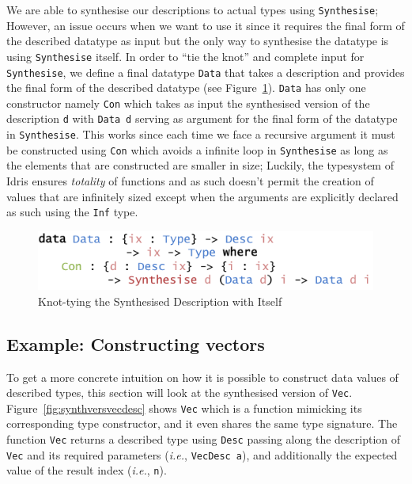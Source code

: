 \documentclass{ituthesis}
\newcommand{\ttconstructor}[1]{\textcolor{constructor-color}{\texttt{#1}}}
\newcommand{\tttype}[1]{\textcolor{type-color}{\texttt{#1}}}
\newcommand{\ttdec}[1]{\textcolor{declared-var-color}{\texttt{#1}}}
\newcommand{\ttvar}[1]{\textcolor{local-var-color}{\texttt{#1}}}
\begin{document}
We are able to synthesise our descriptions to actual types using \ttdec{Synthesise}; However, an issue occurs when we want to use it since it requires the final form of the described datatype as input but the only way to synthesise the datatype is using \ttdec{Synthesise} itself.
In order to ``tie the knot'' and complete input for \ttdec{Synthesise}, we define a final datatype \tttype{Data} that takes a description and provides the final form of the described datatype (see Figure~\ref{fig:datafromdesc}).
\tttype{Data} has only one constructor namely \ttconstructor{Con} which takes as input the synthesised version of the description \ttvar{d} with \tttype{Data}~\ttvar{d} serving as argument for the final form of the datatype in \ttdec{Synthesise}. This works since each time we face a recursive argument it must be constructed using \ttconstructor{Con} which avoids a infinite loop in \ttdec{Synthesise} as long as the elements that are constructed are smaller in size; Luckily, the typesystem of Idris ensures \textit{totality} of functions and as such doesn't permit the creation of values that are infinitely sized except when the arguments are explicitly declared as such using the \tttype{Inf} type.

\begin{figure}[ht]
\begin{center}
    \includegraphics[scale=0.5]{Figures/TyingTheSynthesisKnot.png}
\end{center}
\caption{Knot-tying the Synthesised Description with Itself}
\label{fig:datafromdesc}
\end{figure}

\subsection{Example: Constructing vectors}
\label{sub:Example:Constructing Vectors}

To get a more concrete intuition on how it is possible to construct data values of described types, this section will look at the synthesised version of \tttype{Vec}.
Figure~\ref{fig:synthversvecdesc} shows \ttdec{Vec} which is a function mimicking its corresponding type constructor, and it even shares the same type signature.
The function \ttdec{Vec} returns a described type using \tttype{Desc} passing along the description of \tttype{Vec} and its required parameters (\textit{i.e.}, \ttdec{VecDesc}~\ttvar{a}), 
and additionally the expected value of the result index (\textit{i.e.}, \ttvar{n}).
\end{document}
